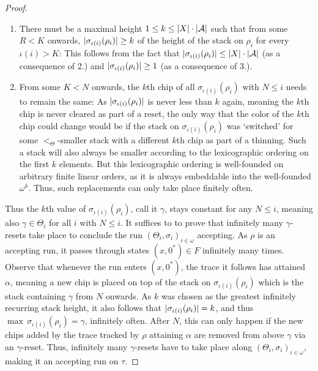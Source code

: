 \begin{proof}
\begin{enumerate}
  \item There must be a maximal height $1 \leq k \leq |X| \cdot |\mathcal{A}|$ such
    that from some $R < K$ onwards, $|\sigma_{\iota(i)}(\rho_i)|
    \geq k$ of the height of the stack on $\rho_i$ 
    for every $\iota(i) > K$: This follows from the fact that $|\sigma_{\iota(i)}(\rho_i)| \leq
    |X| \cdot |\mathcal{A}|$
    (as a consequence of 2.) and 
    $|\sigma_{\iota(i)}(\rho_i)| \geq 1$ (as a consequence of 3.).
  \item 
    From some $K < N$ onwards, the $k$th chip of all
    $\sigma_{{\iota(i)}}(\rho_{i})$ with $N \leq i$ needs to remain the
    same: As
    $|\sigma_{\iota(i)}(\rho_i)|$ is never less than $k$ again, meaning the $k$th chip is
    never cleared as part of a reset, the only way that the color
    of the $k$th chip could change would be if the stack on $\sigma_{\iota(i)}(\rho_i)$ was `switched' for some
    $<_{\Theta}$-smaller stack with a different $k$th chip as part of a
    thinning. Such a stack will also always be smaller according to the
    lexicographic ordering on the first $k$ elements. But this lexicographic
    ordering is well-founded on arbitrary finite linear orders, as it is always
    embeddable into the well-founded $\omega^k$. Thus, such replacements can
    only take place finitely often.
  \end{enumerate}

  Thus the $k$th value of $\sigma_{\iota(i)}(\rho_i)$, call it
  $\gamma$, stays constant for
  any $N \leq i$, meaning also $\gamma \in \Theta_i$ for all $i$ with $N
  \leq i$. It suffices to
  to prove that infinitely many $\gamma$-resets take place to conclude the run
  $(\Theta_i, \sigma_i)_{i \in \omega}$
  accepting. As $\rho$ is an accepting run, it passes through states $(x,
  0^*) \in F$ infinitely
  many times. Observe that whenever the run enters $(x, 0^*)$, the trace it
  follows has attained $\alpha$, meaning a new chip is placed on top of
  the stack on $\sigma_{\iota(i)}(\rho_{i})$ which is the
  stack containing $\gamma$ from $N$ onwards. As $k$ was chosen as the
  greatest infinitely recurring stack height, it also follows that
  $|\sigma_{\iota(i)}(\rho_i)| = k$, and thus
  $\max\,\sigma_{\iota(i)}(\rho_i) = \gamma$,
  infinitely often. After $N$, this can only happen if the new chips added by
  the trace tracked by $\rho$ attaining $\alpha$ are removed from above $\gamma$ via
  an $\gamma$-reset. Thus, infinitely many $\gamma$-resets have to take place
  along $(\Theta_i, \sigma_i)_{i \in \omega}$, making it an accepting run on $\tau$.
\end{proof}

